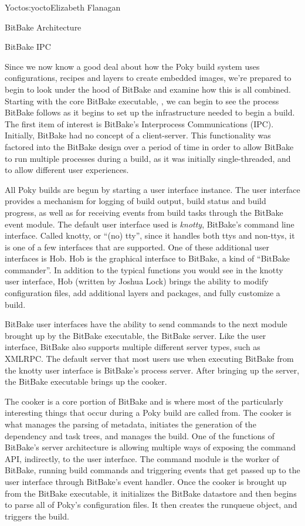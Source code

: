 \begin{aosachapter}{Yocto}{s:yocto}{Elizabeth Flanagan}
\begin{aosasect1}{BitBake Architecture}
\begin{aosasect2}{BitBake IPC}

Since we now know a good deal about how the Poky build system uses
configurations, recipes and layers to create embedded images, we're
prepared to begin to look under the hood of BitBake and examine how
this is all combined. Starting with the core BitBake executable,
, we can begin to see the process BitBake follows as it
begins to set up the infrastructure needed to begin a build. The first
item of interest is BitBake's Interprocess Communications
(IPC). Initially, BitBake had no concept of a
client-server. This functionality was factored into the BitBake design
over a period of time in order to allow BitBake to run multiple
processes during a build, as it was initially single-threaded, and to
allow different user experiences.


All Poky builds are begun by starting a user interface instance. The
user interface provides a mechanism for logging of build output, build
status and build progress, as well as for receiving events from build tasks
through the BitBake event module.  The default user interface used is
\emph{knotty}, BitBake's command line interface. Called knotty, or ``(no)
tty'', since it handles both ttys and non-ttys, it is one of a few
interfaces that are supported.  One of these additional user
interfaces is Hob. Hob is the graphical interface to BitBake, a kind
of ``BitBake commander''. In addition to the typical functions you
would see in the knotty user interface, Hob (written by Joshua Lock)
brings the ability to modify configuration files, add additional
layers and packages, and fully customize a build.

BitBake user interfaces have the ability to send commands to the next
module brought up by the BitBake executable, the BitBake server. Like
the user interface, BitBake also supports multiple different server
types, such as XMLRPC. The default server that most users use
when executing BitBake from the knotty user interface is BitBake's
process server. After bringing up the server, the BitBake executable
brings up the cooker.

The cooker is a core portion of BitBake and is where most of the
particularly interesting things that occur during a Poky build are
called from. The cooker is what manages the parsing of metadata,
initiates the generation of the dependency and task trees, and manages
the build. One of the functions of BitBake's server architecture is
allowing multiple ways of exposing the command API, indirectly, to the
user interface. The command module is the worker of BitBake, running
build commands and triggering events that get passed up to the user
interface through BitBake's event handler.  Once the cooker is brought
up from the BitBake executable, it initializes the BitBake datastore
and then begins to parse all of Poky's configuration files. It then
creates the runqueue object, and triggers the build.


\end{aosasect2}
\end{aosasect1}
\end{aosachapter}
